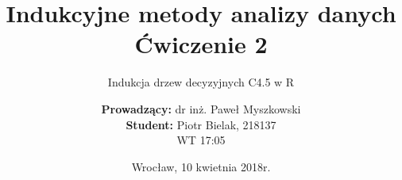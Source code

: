 \documentclass{scrartcl}
\title{Indukcyjne metody analizy danych\\Ćwiczenie 2}
\subtitle{Indukcja drzew decyzyjnych C4.5 w R}
\author{\textbf{Prowadzący:} dr inż. Paweł Myszkowski \\ \textbf{Student:} Piotr Bielak, 218137\\WT 17:05}
\date{Wrocław, 10 kwietnia 2018r.}
\begin{document}
\nocite{*}
\maketitle

\pagebreak
\tableofcontents

\pagebreak





\end{document}
